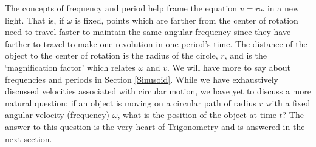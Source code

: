 The concepts of frequency and period help frame the equation $v = r \omega$ in a new light.  That is, if $\omega$ is fixed, points which are farther from the center of rotation need to travel faster to maintain the same angular frequency since they have farther to travel to make one revolution in one period's time.  The distance of the object to the center of rotation is the radius of the circle, $r$, and is the `magnification factor' which relates $\omega$ and $v$. We will have more to say about frequencies and periods in Section \ref{Sinusoid}.  While we have exhaustively discussed velocities associated with circular motion, we have yet to discuss a more natural question: if an object is moving on a circular path of radius $r$ with a fixed angular velocity (frequency) $\omega$, what is the position of the object at time $t$?  The answer to this question is the very heart of Trigonometry and is answered in the next section.





